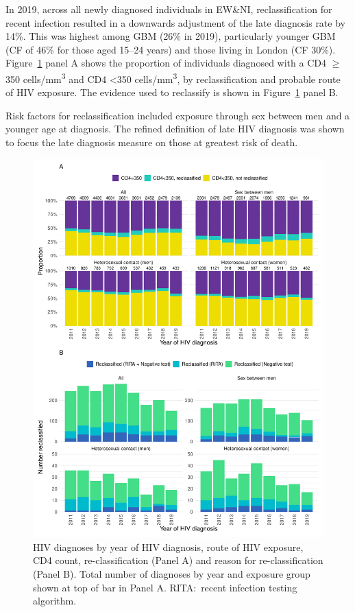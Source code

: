 In 2019, across all newly diagnosed individuals in EW\&NI, reclassification for recent infection resulted in a downwards adjustment of the late diagnosis rate by 14\%. This was highest among GBM (26\% in 2019), particularly younger GBM (CF of 46\% for those aged 15--24 years) and those living in London (CF 30\%). Figure~\ref{fig:latediag} panel A shows the proportion of individuals diagnosed with a CD4 $\geq$350 cells/mm\textsuperscript{3} and CD4 <350 cells/mm\textsuperscript{3}, by reclassification and probable route of HIV exposure. The evidence used to reclassify is shown in Figure~\ref{fig:latediag} panel B.

Risk factors for reclassification included exposure through sex between men and a younger age at diagnosis. The refined definition of late HIV diagnosis was shown to focus the late diagnosis measure on those at greatest risk of death.

\begin{figure}[htbp!]
  \centering
  \includegraphics[width=\textwidth]{latediag.pdf}
  \caption[HIV diagnoses by re-classification and reason for re-classification]{HIV diagnoses by year of HIV diagnosis, route of HIV exposure, CD4 count, re-classification (Panel A) and reason for re-classification (Panel B). Total number of diagnoses by year and exposure group shown at top of bar in Panel A. RITA:\ recent infection testing algorithm.}\label{fig:latediag}
\end{figure}

